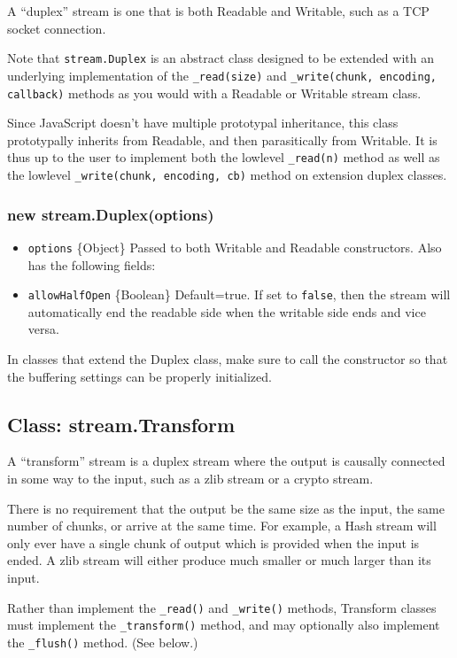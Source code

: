A ``duplex'' stream is one that is both Readable and Writable, such as a
TCP socket connection.

Note that \texttt{stream.Duplex} is an abstract class designed to be
extended with an underlying implementation of the \texttt{\_read(size)}
and \texttt{\_write(chunk, encoding, callback)} methods as you would
with a Readable or Writable stream class.

Since JavaScript doesn't have multiple prototypal inheritance, this
class prototypally inherits from Readable, and then parasitically from
Writable. It is thus up to the user to implement both the lowlevel
\texttt{\_read(n)} method as well as the lowlevel
\texttt{\_write(chunk, encoding, cb)} method on extension duplex
classes.

\subsubsection{new stream.Duplex(options)}

\begin{itemize}
\item
  \texttt{options} \{Object\} Passed to both Writable and Readable
  constructors. Also has the following fields:
\item
  \texttt{allowHalfOpen} \{Boolean\} Default=true. If set to
  \texttt{false}, then the stream will automatically end the readable
  side when the writable side ends and vice versa.
\end{itemize}

In classes that extend the Duplex class, make sure to call the
constructor so that the buffering settings can be properly initialized.

\subsection{Class: stream.Transform}

A ``transform'' stream is a duplex stream where the output is causally
connected in some way to the input, such as a zlib stream or a crypto
stream.

There is no requirement that the output be the same size as the input,
the same number of chunks, or arrive at the same time. For example, a
Hash stream will only ever have a single chunk of output which is
provided when the input is ended. A zlib stream will either produce much
smaller or much larger than its input.

Rather than implement the \texttt{\_read()} and \texttt{\_write()}
methods, Transform classes must implement the \texttt{\_transform()}
method, and may optionally also implement the \texttt{\_flush()} method.
(See below.)

